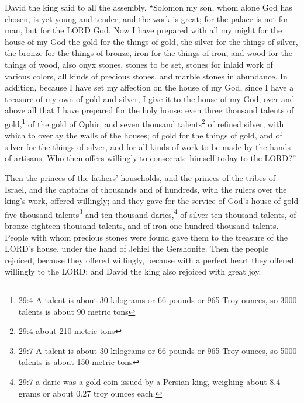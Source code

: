 \mychapter{} \myverse*{}David the king said to all the assembly, “Solomon my son, whom
alone God has chosen, is yet young and tender, and the work is great; for the palace is not for man, but
for the LORD God.
\myverse{}Now I have prepared with all my might for the house of my God the gold for
the things of gold, the silver for the things of silver, the bronze for the things of bronze, iron for
the things of iron, and wood for the things of wood, also onyx stones, stones to be set, stones for inlaid
work of various colors, all kinds of precious stones, and marble stones in abundance.
\myverse{}In addition, because I have set my affection on the house of my God, since
I have a treasure of my own of gold and silver, I give it to the house of my God, over and above all that
I have prepared for the holy house:
\myverse{}even three thousand talents of gold,\footnote{29:4 A talent is about 30 kilograms or 66 pounds or 965 Troy ounces, so 3000 talents is about 90 metric
	tons} of the gold of Ophir, and seven thousand talents\footnote{29:4 about 210 metric tons} of refined silver, with which to overlay the walls of the houses;
\myverse{}of gold for the things of gold, and of silver for the things of silver, and
for all kinds of work to be made by the hands of artisans. Who then offers willingly to consecrate himself
today to the LORD?”

\myverse{}Then the princes of the fathers’ households, and the princes of
the tribes of Israel, and the captains of thousands and of hundreds, with the rulers over the king’s work,
offered willingly;
\myverse{}and they gave for the service of God’s house of gold five thousand talents\footnote{29:7 A talent is about 30 kilograms or 66 pounds or 965 Troy ounces, so 5000 talents is about 150
	metric tons} and ten thousand darics,\footnote{29:7 a daric was a gold coin issued by a Persian king, weighing about 8.4 grams or about 0.27 troy
	ounces each.} of silver ten thousand talents, of bronze eighteen thousand talents, and of iron
one hundred thousand talents.
\myverse{}People with whom precious stones were found gave them to the treasure of the
LORD’s house, under the hand of Jehiel the Gershonite.
\myverse{}Then the people rejoiced, because they offered willingly, because with a perfect
heart they offered willingly to the LORD; and David the king also rejoiced with great joy.

